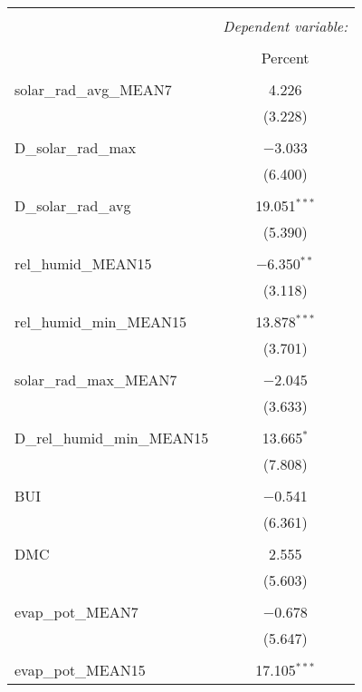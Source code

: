 
\begin{table}[!htbp] \centering 
  \caption{} 
  \label{} 
\begin{tabular}{@{\extracolsep{5pt}}lc} 
\\[-1.8ex]\hline 
\hline \\[-1.8ex] 
 & \multicolumn{1}{c}{\textit{Dependent variable:}} \\ 
\cline{2-2} 
\\[-1.8ex] & Percent \\ 
\hline \\[-1.8ex] 
 solar\_rad\_avg\_MEAN7 & 4.226 \\ 
  & (3.228) \\ 
  & \\ 
 D\_solar\_rad\_max & $-$3.033 \\ 
  & (6.400) \\ 
  & \\ 
 D\_solar\_rad\_avg & 19.051$^{***}$ \\ 
  & (5.390) \\ 
  & \\ 
 rel\_humid\_MEAN15 & $-$6.350$^{**}$ \\ 
  & (3.118) \\ 
  & \\ 
 rel\_humid\_min\_MEAN15 & 13.878$^{***}$ \\ 
  & (3.701) \\ 
  & \\ 
 solar\_rad\_max\_MEAN7 & $-$2.045 \\ 
  & (3.633) \\ 
  & \\ 
 D\_rel\_humid\_min\_MEAN15 & 13.665$^{*}$ \\ 
  & (7.808) \\ 
  & \\ 
 BUI & $-$0.541 \\ 
  & (6.361) \\ 
  & \\ 
 DMC & 2.555 \\ 
  & (5.603) \\ 
  & \\ 
 evap\_pot\_MEAN7 & $-$0.678 \\ 
  & (5.647) \\ 
  & \\ 
 evap\_pot\_MEAN15 & 17.105$^{***}$ \\ 

\end{tabular}
\end{table}
